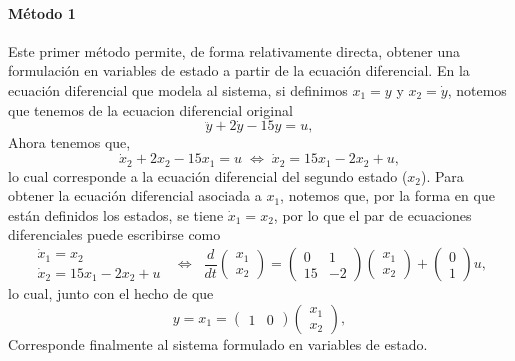 \documentclass[
  11pt,
  letterpaper,
   addpoints,
   answers
  ]{exam}
\begin{document}
\begin{questions}
\begin{solution}
\paragraph{Método 1}
Este primer método permite, de forma relativamente directa, obtener una formulación en variables de estado a partir de la ecuación diferencial. En la ecuación diferencial que modela al sistema, si definimos $x_1 = y$ y $x_2 = \dot{y}$, notemos que tenemos de la ecuacion diferencial original
\begin{equation}
  \ddot{y} + 2\dot{y} - 15 y = u,
\end{equation}
Ahora tenemos que,
\begin{equation}
\dot{x}_2 + 2x_2 - 15x_1 = u \;\Leftrightarrow\; \dot{x}_2 = 15x_1 - 2x_2 + u,
\end{equation}
lo cual corresponde a la ecuación diferencial del segundo estado ($x_2$). Para obtener la ecuación diferencial asociada a $x_1$, notemos que, por la forma en que están definidos los estados, se tiene $\dot{x}_1 = x_2$, por lo que el par de ecuaciones diferenciales puede escribirse como
\begin{equation}
\begin{gathered}
\dot{x}_1 = x_2 \\
\dot{x}_2 = 15x_1 - 2x_2 + u
\end{gathered}
\;\;\Leftrightarrow\;\;
\frac{d}{dt}\begin{pmatrix} x_1 \\ x_2 \end{pmatrix}
=
\begin{pmatrix} 0 & 1 \\[2pt] 15 & -2 \end{pmatrix}
\begin{pmatrix} x_1 \\ x_2 \end{pmatrix}
+
\begin{pmatrix} 0 \\ 1 \end{pmatrix} u,
\end{equation}
lo cual, junto con el hecho de que
\begin{equation}
y = x_1 = \begin{pmatrix} 1 & 0 \end{pmatrix} \begin{pmatrix} x_1 \\ x_2 \end{pmatrix},
\end{equation}
Corresponde finalmente al sistema formulado en variables de estado.


\end{solution}
\end{questions}
\end{document}
